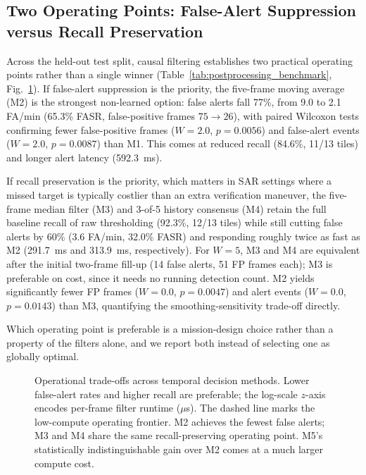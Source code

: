 \documentclass[conference]{IEEEtran}
\begin{document}
\subsection{Two Operating Points: False-Alert Suppression versus Recall Preservation}
Across the held-out test split, causal filtering establishes two practical operating points rather than a single winner (Table~\ref{tab:postprocessing_benchmark}, Fig.~\ref{fig:performance_tradeoff}). If false-alert suppression is the priority, the five-frame moving average (M2) is the strongest non-learned option: false alerts fall 77\%, from 9.0 to 2.1 FA/min (65.3\% FASR, false-positive frames $75\to26$), with paired Wilcoxon tests confirming fewer false-positive frames ($W=2.0$, $p=0.0056$) and false-alert events ($W=2.0$, $p=0.0087$) than M1. This comes at reduced recall (84.6\%, 11/13 tiles) and longer alert latency (592.3~ms).

If recall preservation is the priority, which matters in SAR settings where a missed target is typically costlier than an extra verification maneuver, the five-frame median filter (M3) and 3-of-5 history consensus (M4) retain the full baseline recall of raw thresholding (92.3\%, 12/13 tiles) while still cutting false alerts by 60\% (3.6 FA/min, 32.0\% FASR) and responding roughly twice as fast as M2 (291.7~ms and 313.9~ms, respectively). For $W=5$, M3 and M4 are equivalent after the initial two-frame fill-up (14 false alerts, 51 FP frames each); M3 is preferable on cost, since it needs no running detection count. M2 yields significantly fewer FP frames ($W=0.0$, $p=0.0047$) and alert events ($W=0.0$, $p=0.0143$) than M3, quantifying the smoothing-sensitivity trade-off directly.

Which operating point is preferable is a mission-design choice rather than a property of the filters alone, and we report both instead of selecting one as globally optimal.

\begin{figure}[!t]
\centering
\resizebox{0.98\columnwidth}{!}{}
\caption{Operational trade-offs across temporal decision methods. Lower false-alert rates and higher recall are preferable; the log-scale $z$-axis encodes per-frame filter runtime ($\mu$s). The dashed line marks the low-compute operating frontier. M2 achieves the fewest false alerts; M3 and M4 share the same recall-preserving operating point. M5's statistically indistinguishable gain over M2 comes at a much larger compute cost.}
\label{fig:performance_tradeoff}
\end{figure}
\end{document}
